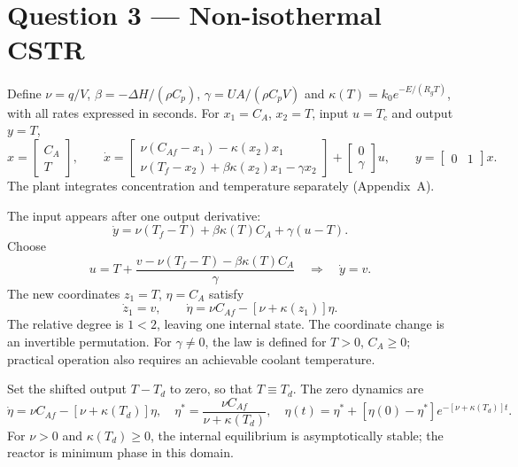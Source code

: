 \section*{Question 3 --- Non-isothermal CSTR}
Define $\nu=q/V$, $\beta=-\Delta H/(\rho C_p)$, $\gamma=UA/(\rho C_pV)$ and $\kappa(T)=k_0e^{-E/(R_gT)}$, with all rates expressed in seconds. For $x_1=C_A$, $x_2=T$, input $u=T_c$ and output $y=T$,
\begin{equation}
x=\begin{bmatrix}C_A\\T\end{bmatrix},\qquad
\boxed{\dot x=
\begin{bmatrix}\nu(C_{Af}-x_1)-\kappa(x_2)x_1\\\nu(T_f-x_2)+\beta\kappa(x_2)x_1-\gamma x_2\end{bmatrix}
+\begin{bmatrix}0\\\gamma\end{bmatrix}u},\qquad
y=\begin{bmatrix}0&1\end{bmatrix}x.
\end{equation}
The plant integrates concentration and temperature separately (Appendix~A).

The input appears after one output derivative:
\begin{equation}
\dot y=\nu(T_f-T)+\beta\kappa(T)C_A+\gamma(u-T).
\end{equation}
Choose
\begin{equation}
\boxed{u=T+\frac{v-\nu(T_f-T)-\beta\kappa(T)C_A}{\gamma}}
\quad\Longrightarrow\quad\dot y=v.
\end{equation}
The new coordinates $z_1=T$, $\eta=C_A$ satisfy
\begin{equation}
\dot z_1=v,\qquad \dot\eta=\nu C_{Af}-[\nu+\kappa(z_1)]\eta.
\end{equation}
The relative degree is $1<2$, leaving one internal state. The coordinate change is an invertible permutation. For $\gamma\ne0$, the law is defined for $T>0$, $C_A\ge0$; practical operation also requires an achievable coolant temperature.

Set the shifted output $T-T_d$ to zero, so that $T\equiv T_d$. The zero dynamics are
\begin{equation}
\dot\eta=\nu C_{Af}-[\nu+\kappa(T_d)]\eta,\quad
\eta^*=\frac{\nu C_{Af}}{\nu+\kappa(T_d)},\quad
\eta(t)=\eta^*+[\eta(0)-\eta^*]e^{-[\nu+\kappa(T_d)]t}.
\end{equation}
For $\nu>0$ and $\kappa(T_d)\ge0$, the internal equilibrium is asymptotically stable; the reactor is minimum phase in this domain.

